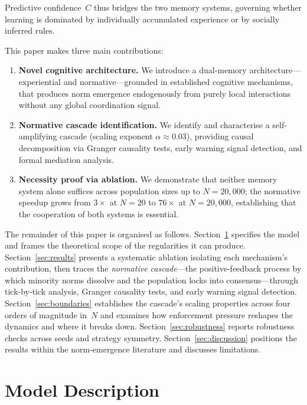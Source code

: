 \documentclass[11pt,a4paper]{article}
\begin{document}
Predictive confidence~$C$ thus bridges the two memory systems, governing whether learning is dominated by individually accumulated experience or by socially inferred rules.

This paper makes three main contributions:
\begin{enumerate}[leftmargin=*,topsep=4pt,itemsep=2pt]
\item \textbf{Novel cognitive architecture.} We introduce a dual-memory architecture---experiential and normative---grounded in established cognitive mechanisms, that produces norm emergence endogenously from purely local interactions without any global coordination signal.
\item \textbf{Normative cascade identification.} We identify and characterise a self-amplifying cascade (scaling exponent $\alpha \approx 0.03$), providing causal decomposition via Granger causality tests, early warning signal detection, and formal mediation analysis.
\item \textbf{Necessity proof via ablation.} We demonstrate that neither memory system alone suffices across population sizes up to $N = 20{,}000$; the normative speedup grows from $3\times$ at $N = 20$ to $76\times$ at $N = 20{,}000$, establishing that the cooperation of both systems is essential.
\end{enumerate}

The remainder of this paper is organised as follows. Section~\ref{sec:model} specifies the model and frames the theoretical scope of the regularities it can produce. Section~\ref{sec:results} presents a systematic ablation isolating each mechanism's contribution, then traces the \emph{normative cascade}---the positive-feedback process by which minority norms dissolve and the population locks into consensus---through tick-by-tick analysis, Granger causality tests, and early warning signal detection. Section~\ref{sec:boundaries} establishes the cascade's scaling properties across four orders of magnitude in~$N$ and examines how enforcement pressure reshapes the dynamics and where it breaks down. Section~\ref{sec:robustness} reports robustness checks across seeds and strategy symmetry. Section~\ref{sec:discussion} positions the results within the norm-emergence literature and discusses limitations.

\section{Model Description}
\label{sec:model}
\end{document}
